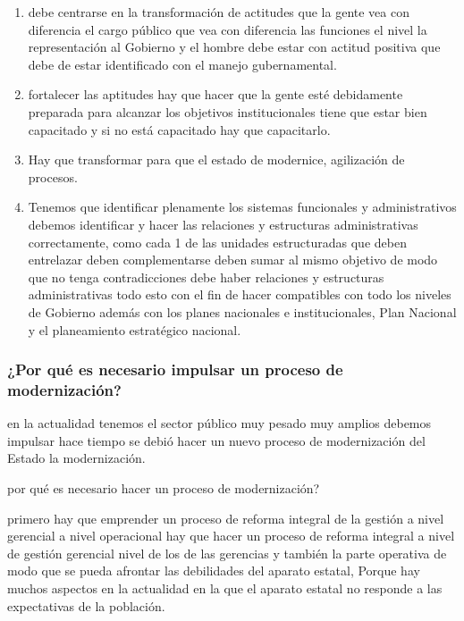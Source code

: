 \documentclass[
  letterpaper,
  DIV=11,
  numbers=noendperiod]{scrartcl}
\providecommand{\tightlist}{%
  \setlength{\itemsep}{0pt}\setlength{\parskip}{0pt}}\usepackage{longtable,booktabs,array}
\begin{document}
\begin{enumerate}
\def\labelenumi{\arabic{enumi}.}
\tightlist
\item
  debe centrarse en la transformación de actitudes que la gente vea con
  diferencia el cargo público que vea con diferencia las funciones el
  nivel la representación al Gobierno y el hombre debe estar con actitud
  positiva que debe de estar identificado con el manejo gubernamental.
\item
  fortalecer las aptitudes hay que hacer que la gente esté debidamente
  preparada para alcanzar los objetivos institucionales tiene que estar
  bien capacitado y si no está capacitado hay que capacitarlo.
\item
  Hay que transformar para que el estado de modernice, agilización de
  procesos.
\item
  Tenemos que identificar plenamente los sistemas funcionales y
  administrativos debemos identificar y hacer las relaciones y
  estructuras administrativas correctamente, como cada 1 de las unidades
  estructuradas que deben entrelazar deben complementarse deben sumar al
  mismo objetivo de modo que no tenga contradicciones debe haber
  relaciones y estructuras administrativas todo esto con el fin de hacer
  compatibles con todo los niveles de Gobierno además con los planes
  nacionales e institucionales, Plan Nacional y el planeamiento
  estratégico nacional.
\end{enumerate}

\hypertarget{por-quuxe9-es-necesario-impulsar-un-proceso-de-modernizaciuxf3n}{%
\subsubsection{¿Por qué es necesario impulsar un proceso de
modernización?}\label{por-quuxe9-es-necesario-impulsar-un-proceso-de-modernizaciuxf3n}}

en la actualidad tenemos el sector público muy pesado muy amplios
debemos impulsar hace tiempo se debió hacer un nuevo proceso de
modernización del Estado la modernización.

por qué es necesario hacer un proceso de modernización?

primero hay que emprender un proceso de reforma integral de la gestión a
nivel gerencial a nivel operacional hay que hacer un proceso de reforma
integral a nivel de gestión gerencial nivel de los de las gerencias y
también la parte operativa de modo que se pueda afrontar las debilidades
del aparato estatal, Porque hay muchos aspectos en la actualidad en la
que el aparato estatal no responde a las expectativas de la población.
\end{document}
